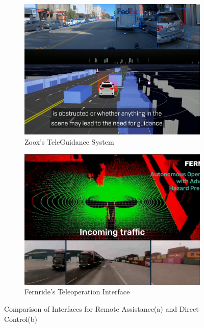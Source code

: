 \begin{figure}
    \centering
    \begin{subfigure}[b]{0.48\textwidth}
        \centering
        \includegraphics[width=1\textwidth]{figures/zoox.png}
        \caption{Zoox's TeleGuidance System}
        \label{fig:Zoox}
    \end{subfigure}
    \hfill
    \begin{subfigure}[b]{0.48\textwidth}
        \centering
        \includegraphics[width=1\textwidth]{figures/fernride.png}
        \caption{Fernride's Teleoperation Interface}
        \label{fig:Fernride}
    \end{subfigure}
    \caption{Comparison of Interfaces for Remote Assistance(a) and Direct Control(b)}
    \label{fig:TeleoperationComparison}
\end{figure}

